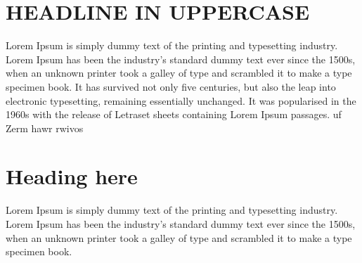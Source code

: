 \documentclass[final]{beamer}
\author{
  \small Mario Armando, Urbina Silva \\
  \footnotesize{mariosva139@hotmail.com}, \\Escuela de Ciencias Físicas y Matemáticas, \\Universidad de San Carlos de Guatemala}
\begin{document}
\begin{poster}



\newcolumn
\section{HEADLINE IN UPPERCASE}
\justifying
Lorem Ipsum is simply dummy text of the printing and typesetting industry. Lorem Ipsum has been the industry's standard dummy text ever since the 1500s, when an unknown printer took a galley of type and scrambled it to make a type specimen book. It has survived not only five centuries, but also the leap into electronic typesetting, remaining essentially unchanged. It was popularised in the 1960s with the release of Letraset sheets containing Lorem Ipsum passages. uf Zerm hawr rwivos


\section{Heading here}
\justifying
Lorem Ipsum is simply dummy text of the printing and typesetting industry. Lorem Ipsum has been the industry's standard dummy text ever since the 1500s, when an unknown printer took a galley of type and scrambled it to make a type specimen book. 


\end{poster}
\end{document}
